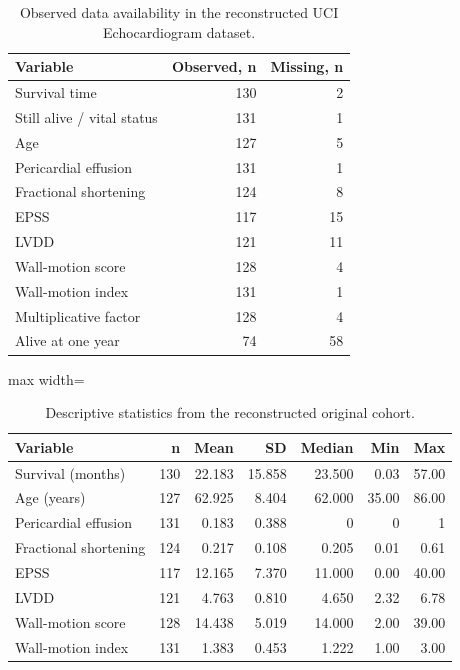 \documentclass[a4paper,12pt]{article}
\begin{document}
\begin{table}[H]
\centering
\caption{Observed data availability in the reconstructed UCI Echocardiogram dataset.}
\label{tab:missingness}
\begin{tabular}{lrr}
\toprule
Variable & Observed, n & Missing, n \\
\midrule
Survival time & 130 & 2 \\
Still alive / vital status & 131 & 1 \\
Age & 127 & 5 \\
Pericardial effusion & 131 & 1 \\
Fractional shortening & 124 & 8 \\
EPSS & 117 & 15 \\
LVDD & 121 & 11 \\
Wall-motion score & 128 & 4 \\
Wall-motion index & 131 & 1 \\
Multiplicative factor & 128 & 4 \\
Alive at one year & 74 & 58 \\
\bottomrule
\end{tabular}
\end{table}

\begin{table}[H]
\centering
\caption{Descriptive statistics from the reconstructed original cohort.}
\label{tab:descriptive}
\begin{adjustbox}{max width=\linewidth}
\begin{tabular}{lrrrrrr}
\toprule
Variable & n & Mean & SD & Median & Min & Max \\
\midrule
Survival (months) & 130 & 22.183 & 15.858 & 23.500 & 0.03 & 57.00 \\
Age (years) & 127 & 62.925 & 8.404 & 62.000 & 35.00 & 86.00 \\
Pericardial effusion & 131 & 0.183 & 0.388 & 0 & 0 & 1 \\
Fractional shortening & 124 & 0.217 & 0.108 & 0.205 & 0.01 & 0.61 \\
EPSS & 117 & 12.165 & 7.370 & 11.000 & 0.00 & 40.00 \\
LVDD & 121 & 4.763 & 0.810 & 4.650 & 2.32 & 6.78 \\
Wall-motion score & 128 & 14.438 & 5.019 & 14.000 & 2.00 & 39.00 \\
Wall-motion index & 131 & 1.383 & 0.453 & 1.222 & 1.00 & 3.00 \\
\bottomrule
\end{tabular}
\end{adjustbox}
\end{table}
\end{document}
